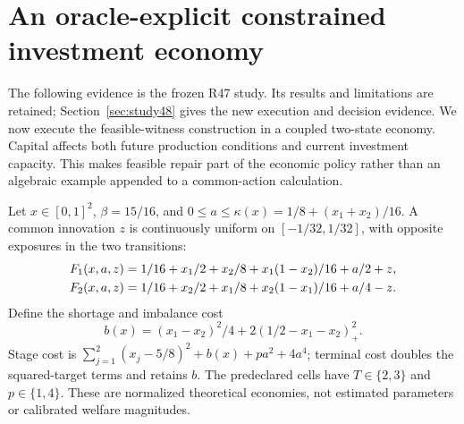 \section{An oracle-explicit constrained investment economy}\label{sec:constrained47}

The following evidence is the frozen R47 study. Its results and limitations are retained; Section~\ref{sec:study48} gives the new execution and decision evidence.
We now execute the feasible-witness construction in a coupled two-state economy. Capital affects both future production conditions and current investment capacity. This makes feasible repair part of the economic policy rather than an algebraic example appended to a common-action calculation.

Let $x\in[0,1]^2$, $\beta=15/16$, and $0\le a\le\kappa(x)=1/8+(x_1+x_2)/16$. A common innovation $z$ is continuously uniform on $[-1/32,1/32]$, with opposite exposures in the two transitions:
\begin{align}\label{eq:economy47}
 F_1(x,a,z)&=1/16+x_1/2+x_2/8+x_1(1-x_2)/16+a/2+z,\\
 F_2(x,a,z)&=1/16+x_2/2+x_1/8+x_2(1-x_1)/16+a/4-z.\notag
\end{align}
Define the shortage and imbalance cost
\[
 b(x)=(x_1-x_2)^2/4+2(1/2-x_1-x_2)_+^2.
\]
Stage cost is $\sum_{j=1}^2(x_j-5/8)^2+b(x)+pa^2+4a^4$; terminal cost doubles the squared-target terms and retains $b$. The predeclared cells have $T\in\{2,3\}$ and $p\in\{1,4\}$. These are normalized theoretical economies, not estimated parameters or calibrated welfare magnitudes.

